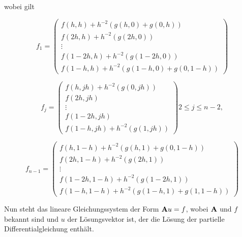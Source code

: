 wobei gilt

\begin{equation}
f_{1} = 
\begin{pmatrix}
f(h,h) + h^{-2}(g(h,0)+g(0,h)) \\
f(2h,h) + h^{-2}(g(2h,0)) \\
\vdots \\
f(1-2h,h) + h^{-2}(g(1-2h,0)) \\
f(1-h,h) + h^{-2}(g(1-h,0)+g(0,1-h))
\end{pmatrix}
\end{equation}

\begin{equation}
f_{j} = 
\begin{pmatrix}
f(h,jh) + h^{-2}(g(0,jh)) \\
f(2h,jh) \\
\vdots \\
f(1-2h,jh) \\
f(1-h,jh) + h^{-2}(g(1,jh))
\end{pmatrix}
2 \le j \le n-2,
\end{equation}

\begin{equation}
f_{n-1} = 
\begin{pmatrix}
f(h,1-h) + h^{-2}(g(h,1)+g(0,1-h)) \\
f(2h,1-h) + h^{-2}(g(2h,1)) \\
\vdots \\
f(1-2h,1-h) + h^{-2}(g(1-2h,1)) \\
f(1-h,1-h) + h^{-2}(g(1-h,1)+g(1,1-h))
\end{pmatrix}
\end{equation}

Nun steht das lineare Gleichungssystem der Form ${\textbf{A}}u = f$, wobei ${\textbf{A}}$ und $f$ bekannt sind und $u$ der Lösungsvektor ist, der die Lösung der partielle Differentialgleichung enthält.




